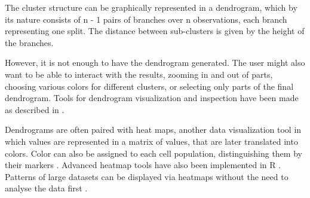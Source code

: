 The cluster structure can be graphically represented in a dendrogram, which by its nature consists of n - 1 pairs of branches over n observations, each branch representing one split. The distance between sub-clusters is given by the height of the branches. 

However, it is not enough to have the dendrogram generated. The user might also want to be able to interact with the results, zooming in and out of parts, choosing various colors for different clusters, or selecting only parts of the final dendrogram. Tools for dendrogram visualization and inspection have been made as described in \cite{sieger2017interactive}.

Dendrograms are often paired with heat maps, another data visualization tool in which values are represented in a matrix of values, that are later translated into colors. Color can also be assigned to each cell population, distinguishing them by their markers \cite{ellyard2019non}. Advanced heatmap tools have also been implemented in R \citep{zhao2014advanced}. Patterns of large datasets can be displayed via heatmaps without the need to analyse the data first \citep{key2012tutorial}.













